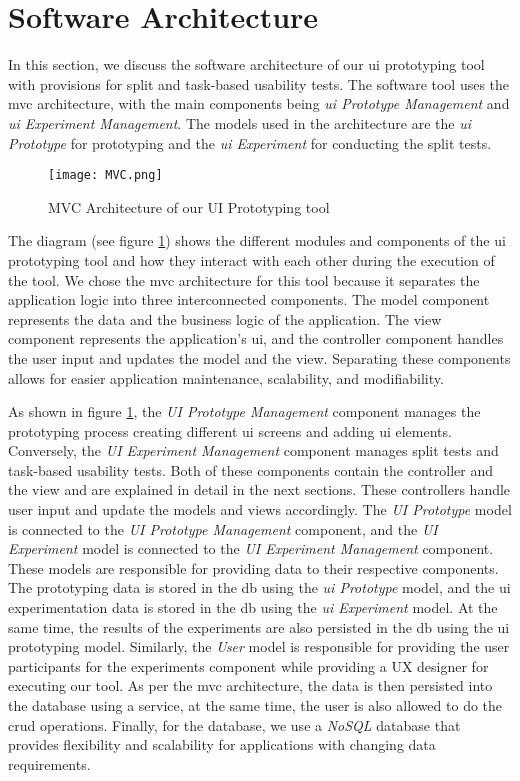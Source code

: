\section{Software Architecture}
\label{sc:section:architecture}
In this section, we discuss the software architecture of our \ac{ui} prototyping tool with provisions for split and task-based usability tests. 
The software tool uses the \ac{mvc} architecture, with the main components being \textit{\ac{ui} Prototype Management} and \textit{\ac{ui} Experiment Management}. 
The models used in the architecture are the \textit{\ac{ui} Prototype} for prototyping and the \textit{\ac{ui} Experiment} for conducting the split tests. 
\begin{figure}[htbp!]
    \centering    
    \texttt{[image: MVC.png]} 
    \caption[MVC Architecture of the System]{MVC Architecture of our UI Prototyping tool}
    \label{fig:sc:componentD}
\end{figure}
The diagram (see figure \ref{fig:sc:componentD}) shows the different modules and components of the \ac{ui} prototyping tool and how they interact with each other during the execution of the tool.
We chose the \ac{mvc} architecture for this tool because it separates the application logic into three interconnected components. 
The model component represents the data and the business logic of the application. 
The view component represents the application's \ac{ui}, and the controller component handles the user input and updates the model and the view. 
Separating these components allows for easier application maintenance, scalability, and modifiability.

As shown in figure \ref{fig:sc:componentD}, the \textit{UI Prototype Management} component manages the prototyping process creating different \ac{ui} screens and adding \ac{ui} elements. 
Conversely, the \textit{UI Experiment Management} component manages split tests and task-based usability tests.
Both of these components contain the controller and the view and are explained in detail in the next sections. 
These controllers handle user input and update the models and views accordingly.
The \textit{UI Prototype} model is connected to the \textit{UI Prototype Management} component, and the \textit{UI Experiment} model is connected to the \textit{UI Experiment Management} component.
These models are responsible for providing data to their respective components.
The prototyping data is stored in the \ac{db} using the \textit{\ac{ui} Prototype} model, and the \ac{ui} experimentation data is stored in the \ac{db} using the \textit{\ac{ui} Experiment} model.
At the same time, the results of the experiments are also persisted in the \ac{db} using the \ac{ui} prototyping model.
Similarly, the \textit{User} model is responsible for providing the user participants for the experiments component while providing a UX designer for executing our tool.
As per the \ac{mvc} architecture, the data is then persisted into the database using a service, at the same time, the user is also allowed to do the \ac{crud} operations.  
Finally, for the database, we use a \textit{NoSQL} database that provides flexibility and scalability for applications with changing data requirements. 


